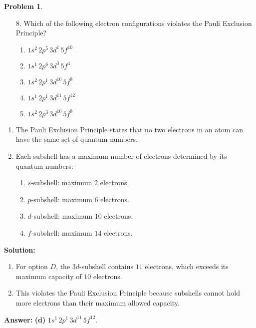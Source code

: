 \documentclass[12pt]{article}
\theoremstyle{definition} %
\newtheorem{problem}{Problem}
\theoremstyle{plain} %
\begin{document}
\begin{problem}
\begin{enumerate}
    \item[8.] Which of the following electron configurations violates the Pauli Exclusion Principle?
    \begin{enumerate}
        \item \(1s^2 \, 2p^5 \, 3d^1 \, 5f^{10}\)
        \item \(1s^1 \, 2p^6 \, 3d^3 \, 5f^4\)
        \item \(1s^2 \, 2p^1 \, 3d^{10} \, 5f^8\)
        \item \(1s^1 \, 2p^1 \, 3d^{11} \, 5f^{12}\)
        \item \(1s^2 \, 2p^3 \, 3d^{10} \, 5f^8\)
    \end{enumerate}
\end{enumerate}

\begin{enumerate}
    \item The Pauli Exclusion Principle states that no two electrons in an atom can have the same set of quantum numbers.
    \item Each subshell has a maximum number of electrons determined by its quantum numbers:
    \begin{enumerate}
        \item \(s\)-subshell: maximum \(2\) electrons.
        \item \(p\)-subshell: maximum \(6\) electrons.
        \item \(d\)-subshell: maximum \(10\) electrons.
        \item \(f\)-subshell: maximum \(14\) electrons.
    \end{enumerate}
\end{enumerate}

\textbf{Solution:}
\begin{enumerate}
    \item For option \(D\), the \(3d\)-subshell contains \(11\) electrons, which exceeds its maximum capacity of \(10\) electrons.
    \item This violates the Pauli Exclusion Principle because subshells cannot hold more electrons than their maximum allowed capacity.
\end{enumerate}

\textbf{Answer:} \textbf{(d)} \(1s^1 \, 2p^1 \, 3d^{11} \, 5f^{12}\).

\end{problem}
\end{document}
